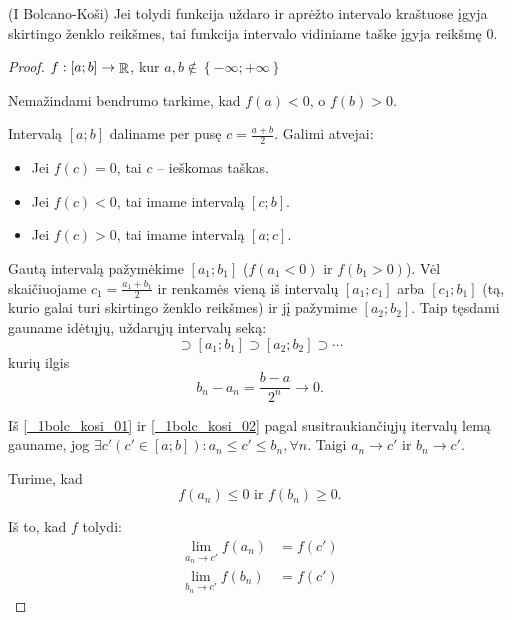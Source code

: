 \begin{prop}
  (I Bolcano-Koši) Jei tolydi funkcija uždaro ir aprėžto intervalo 
  kraštuose įgyja skirtingo ženklo reikšmes, tai funkcija intervalo
  vidiniame taške įgyja reikšmę 0.

  \begin{proof}
    $f : [a;b] \to \mathop{\mathbb{R}}$, kur 
    $a, b \notin \left\{ -\infty; +\infty \right\}$

    Nemažindami bendrumo tarkime, kad $f(a) < 0$, o $f(b) > 0$.

    Intervalą $[a;b]$ daliname per pusę $c = \frac{a + b}{2}$.
    Galimi atvejai:
    \begin{itemize}
      \item Jei $f(c) = 0$, tai $c$ – ieškomas taškas.
      \item Jei $f(c) < 0$, tai imame intervalą $[c;b]$.
      \item Jei $f(c) > 0$, tai imame intervalą $[a;c]$.
    \end{itemize}
    Gautą intervalą pažymėkime $[a_{1};b_{1}]$ 
    ($f(a_{1} < 0)$ ir $f(b_{1} > 0)$). Vėl skaičiuojame
    $c_{1} = \frac{a_{1} + b_{1}}{2}$ ir renkamės vieną iš intervalų
    $[a_{1};c_{1}]$ arba $[c_{1};b_{1}]$ (tą, kurio galai turi skirtingo
    ženklo reikšmes) ir jį pažymime $[a_{2}; b_{2}]$. Taip tęsdami gauname
    idėtųjų, uždarųjų intervalų seką:
    \begin{equation}
      [a;b] \supset [a_{1};b_{1}] \supset [a_{2};b_{2}] \supset \cdots
      \label{_1bolc_kosi_01}
    \end{equation}
    kurių ilgis
    \begin{equation}
      b_{n} - a_{n} = \frac{b - a}{2^{n}} \to 0.
      \label{_1bolc_kosi_02}
    \end{equation}

    Iš \ref{_1bolc_kosi_01} ir \ref{_1bolc_kosi_02} 
    pagal susitraukiančiųjų itervalų lemą gauname, jog 
    $\exists c' (c' \in [a;b]) : a_{n} \leq c' \leq b_{n}, \forall n$. 
    Taigi $a_{n} \to c'$ ir $b_{n} \to c'$.

    Turime, kad
    \begin{equation}
      f(a_{n}) \leq 0 \text{ ir } f(b_{n}) \geq 0.
      \label{_1bolc_kosi_03}
    \end{equation}

    Iš to, kad $f$ tolydi:
    \begin{align}
      \lim_{a_{n} \to c'} f(a_{n}) &= f(c')
      \label{_1bolc_kosi_04} \\
      \lim_{b_{n} \to c'} f(b_{n}) &= f(c')
      \label{_1bolc_kosi_05}
    \end{align}


\end{proof}
\end{prop}
